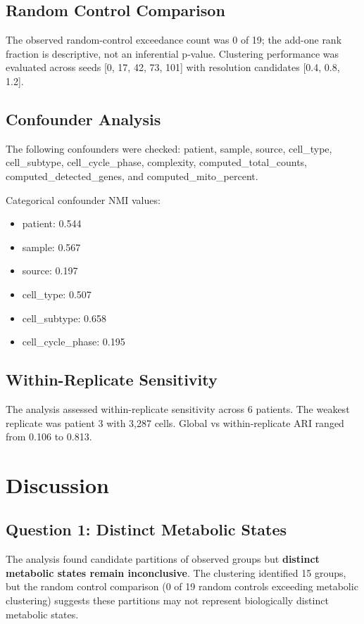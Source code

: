 \documentclass[10pt]{article}
\begin{document}
\subsection{Random Control Comparison}

The observed random-control exceedance count was 0 of 19; the add-one rank fraction is descriptive, not an inferential p-value. Clustering performance was evaluated across seeds [0, 17, 42, 73, 101] with resolution candidates [0.4, 0.8, 1.2].

\subsection{Confounder Analysis}

The following confounders were checked: patient, sample, source, cell\_type, cell\_subtype, cell\_cycle\_phase, complexity, computed\_total\_counts, computed\_detected\_genes, and computed\_mito\_percent.

Categorical confounder NMI values:
\begin{itemize}
    \item patient: 0.544
    \item sample: 0.567
    \item source: 0.197
    \item cell\_type: 0.507
    \item cell\_subtype: 0.658
    \item cell\_cycle\_phase: 0.195
\end{itemize}

\subsection{Within-Replicate Sensitivity}

The analysis assessed within-replicate sensitivity across 6 patients. The weakest replicate was patient 3 with 3,287 cells. Global vs within-replicate ARI ranged from 0.106 to 0.813.

\section{Discussion}

\subsection{Question 1: Distinct Metabolic States}

The analysis found candidate partitions of observed groups but \textbf{distinct metabolic states remain inconclusive}. The clustering identified 15 groups, but the random control comparison (0 of 19 random controls exceeding metabolic clustering) suggests these partitions may not represent biologically distinct metabolic states.
\end{document}

